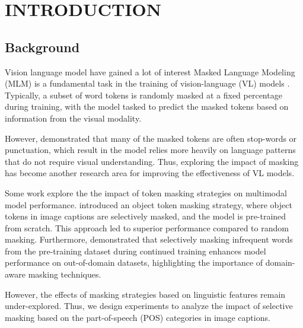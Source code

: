 \setlength{\parindent}{0in}
\setlength{\parskip}{1.5mm}
\setlength{\baselineskip}{1.6em}

\chapter{INTRODUCTION}
\section{Background}
Vision language model have gained a lot of interest 
Masked Language Modeling (MLM) is a fundamental task in the training of vision-language (VL) models \cite{albef, mplug, uniter, beit-3}. 
Typically, a subset of word tokens is randomly masked at a fixed percentage during training, with the model tasked to predict the masked tokens based on information from the visual modality. 

However,  demonstrated that many of the masked tokens are often stop-words or punctuation, which result in the model relies more heavily on language patterns that do not require visual understanding.
Thus, exploring the impact of masking has become another research area for improving the effectiveness of VL models.

Some work explore the the impact of token masking strategies on multimodal model performance. 
 introduced an object token masking strategy, where object tokens in image captions are selectively masked, and the model is pre-trained from scratch.
This approach led to superior performance compared to random masking. 
Furthermore,  demonstrated that selectively masking infrequent words from the pre-training dataset during continued training enhances model performance on out-of-domain datasets, highlighting the importance of domain-aware masking techniques.

However, the effects of masking strategies based on linguistic features remain under-explored. 
Thus, we design experiments to analyze the impact of selective masking based on the part-of-speech (POS) categories in image captions.


